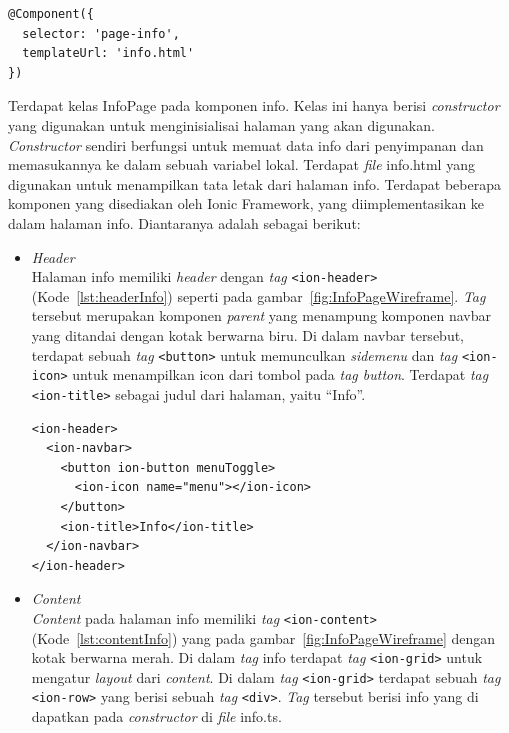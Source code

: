 \begin{enumerate}
\begin{enumerate}
\begin{lstlisting}[label={lst:componentinfo}, caption=@Component pada info.ts]
@Component({
  selector: 'page-info',
  templateUrl: 'info.html'
})
\end{lstlisting} 

	Terdapat kelas InfoPage pada komponen info. Kelas ini hanya berisi \textit{constructor} yang digunakan untuk menginisialisai halaman yang akan digunakan. \textit{Constructor} sendiri berfungsi untuk memuat data info dari penyimpanan dan memasukannya ke dalam sebuah variabel lokal.
	Terdapat \textit{file} info.html yang digunakan untuk menampilkan tata letak dari halaman info. Terdapat beberapa komponen yang disediakan oleh Ionic Framework, yang diimplementasikan ke dalam halaman info. Diantaranya adalah sebagai berikut:
	
	\begin{itemize}
		\item \textit{Header} \\
		Halaman info memiliki \textit{header} dengan \textit{tag} \texttt{<ion-header>} (Kode~\ref{lst:headerInfo}) seperti pada gambar~\ref{fig:InfoPageWireframe}. \textit{Tag} tersebut merupakan komponen \textit{parent} yang menampung komponen navbar yang ditandai dengan kotak berwarna biru. Di dalam navbar tersebut, terdapat sebuah \textit{tag} \texttt{<button>} untuk memunculkan \textit{sidemenu} dan \textit{tag} \texttt{<ion-icon>} untuk menampilkan icon dari tombol pada \textit{tag button}. Terdapat \textit{tag} \texttt{<ion-title>} sebagai judul dari halaman, yaitu ``Info''.
	
\begin{lstlisting}[label={lst:headerInfo}, caption=\textit{Header} pada info.html]
<ion-header>
  <ion-navbar>
    <button ion-button menuToggle>
      <ion-icon name="menu"></ion-icon>
    </button>
    <ion-title>Info</ion-title>
  </ion-navbar>
</ion-header>
\end{lstlisting} 

		\item \textit{Content} \\
		\textit{Content} pada halaman info memiliki \textit{tag} \texttt{<ion-content>} (Kode~\ref{lst:contentInfo}) yang pada gambar~\ref{fig:InfoPageWireframe} dengan kotak berwarna merah. Di dalam \textit{tag} info terdapat \textit{tag} \texttt{<ion-grid>} untuk mengatur \textit{layout} dari \textit{content}. Di dalam \textit{tag} \texttt{<ion-grid>} terdapat sebuah \textit{tag} \texttt{<ion-row>} yang berisi sebuah \textit{tag} \texttt{<div>}. \textit{Tag} tersebut berisi info yang di dapatkan pada \textit{constructor} di \textit{file} info.ts.


\end{itemize}
\end{enumerate}
\end{enumerate}
